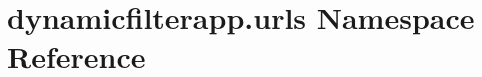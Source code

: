 \hypertarget{namespacedynamicfilterapp_1_1urls}{}\section{dynamicfilterapp.\+urls Namespace Reference}
\label{namespacedynamicfilterapp_1_1urls}
